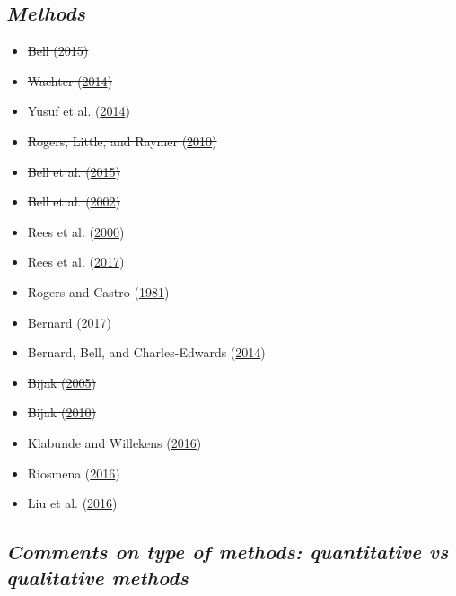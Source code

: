 \documentclass[
]{article}
\providecommand{\tightlist}{%
  \setlength{\itemsep}{0pt}\setlength{\parskip}{0pt}}
\begin{document}
\hypertarget{methods}{%
\subsection{\texorpdfstring{\emph{Methods}}{Methods}}\label{methods}}

\begin{itemize}
\tightlist
\item
  \sout{Bell (\protect\hyperlink{ref-bell2015demography}{2015})}
\item
  \sout{Wachter (\protect\hyperlink{ref-wachter2014essential}{2014})}
\item
  Yusuf et al. (\protect\hyperlink{ref-yusuf2014methods}{2014})
\item
  \sout{Rogers, Little, and Raymer
  (\protect\hyperlink{ref-rogers2010indirect}{2010})}
\item
  \sout{Bell et al. (\protect\hyperlink{ref-bell2015internal}{2015})}
\item
  \sout{Bell et al. (\protect\hyperlink{ref-bell2002cross}{2002})}
\item
  Rees et al. (\protect\hyperlink{ref-rees2000problems}{2000})
\item
  Rees et al. (\protect\hyperlink{ref-rees2017impact}{2017})
\item
  Rogers and Castro (\protect\hyperlink{ref-rogers1981model}{1981})
\item
  Bernard (\protect\hyperlink{ref-bernard2017cohort}{2017})
\item
  Bernard, Bell, and Charles-Edwards
  (\protect\hyperlink{ref-bernard2014life}{2014})
\item
  \sout{Bijak (\protect\hyperlink{ref-bijak2005bayesian}{2005})}
\item
  \sout{Bijak (\protect\hyperlink{ref-bijak2010forecasting}{2010})}
\item
  Klabunde and Willekens
  (\protect\hyperlink{ref-klabunde2016decision}{2016})
\item
  Riosmena (\protect\hyperlink{ref-riosmena2016potential}{2016})
\item
  Liu et al. (\protect\hyperlink{ref-liu2016prospects}{2016})
\end{itemize}

\hypertarget{comments-on-type-of-methods-quantitative-vs-qualitative-methods}{%
\subsection{\texorpdfstring{\emph{Comments on type of methods:
quantitative vs qualitative
methods}}{Comments on type of methods: quantitative vs qualitative methods}}\label{comments-on-type-of-methods-quantitative-vs-qualitative-methods}}
\end{document}
